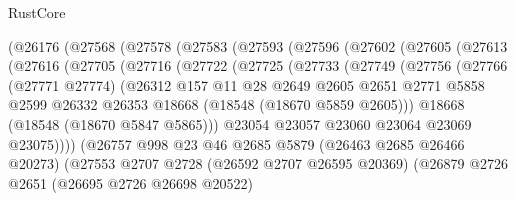 \begin{lexlean}{RustCore}
\begin{coremodule}
          (@26176
            (@27568
              (@27578
                (@27583
                  (@27593
                    (@27596
                      (@27602
                        (@27605
                          (@27613
                            (@27616
                              (@27705
                                (@27716
                                  (@27722
                                    (@27725
                                      (@27733
                                        (@27749
                                          (@27756
                                            (@27766
                                              (@27771 @27774)
                                              (@26312
                                                @157
                                                @11
                                                @28
                                                @2649
                                                @2605
                                                @2651
                                                @2771
                                                @5858
                                                @2599
                                                @26332
                                                @26353
                                                @18668
                                                (@18548 (@18670 @5859 @2605)))
                                              @18668
                                              (@18548 (@18670 @5847 @5865)))
                                            @23054
                                            @23057
                                            @23060
                                            @23064
                                            @23069
                                            @23075))))
                                    (@26757
                                      @998
                                      @23
                                      @46
                                      @2685
                                      @5879
                                      (@26463 @2685 @26466 @20273)
                                      (@27553
                                        @2707
                                        @2728
                                        (@26592 @2707 @26595 @20369)
                                        (@26879
                                          @2726
                                          @2651
                                          (@26695 @2726 @26698 @20522)

\end{coremodule}
\end{lexlean}
